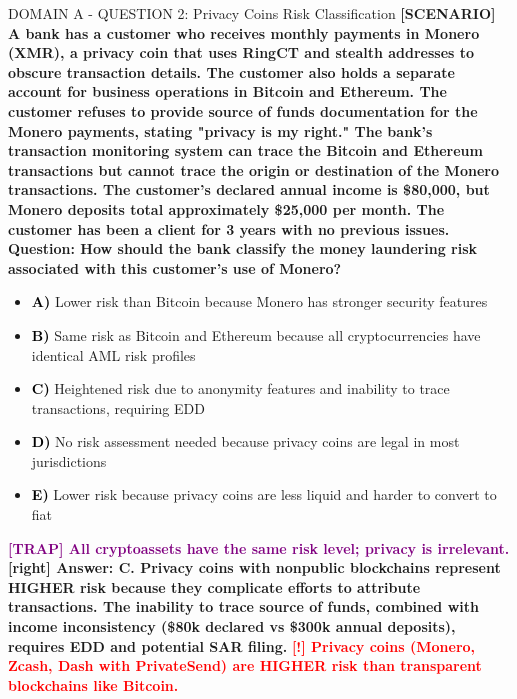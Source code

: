 \documentclass[11pt,a4paper]{beamer}
\newcommand{\redflag}[1]{\textcolor{red}{\textbf{[!] #1}}}
\newcommand{\trap}[1]{\textcolor{purple}{\textbf{[TRAP] #1}}}
\newcommand{\correct}[1]{\textcolor{green!50!black}{\textbf{[right] #1}}}
\newcommand{\scenario}[1]{\textcolor{blue!70!black}{\textbf{[SCENARIO] #1}}}
\newcommand{\option}[1]{\textcolor{black}{\textbf{#1}}}
\begin{document}
\begin{frame}{DOMAIN A - QUESTION 2: Privacy Coins Risk Classification}
\scenario{A bank has a customer who receives monthly payments in Monero (XMR), a privacy coin that uses RingCT and stealth addresses to obscure transaction details. The customer also holds a separate account for business operations in Bitcoin and Ethereum. The customer refuses to provide source of funds documentation for the Monero payments, stating "privacy is my right." The bank's transaction monitoring system can trace the Bitcoin and Ethereum transactions but cannot trace the origin or destination of the Monero transactions. The customer's declared annual income is \$80,000, but Monero deposits total approximately \$25,000 per month. The customer has been a client for 3 years with no previous issues.}
\vspace{0.2cm}
\textbf{Question: How should the bank classify the money laundering risk associated with this customer's use of Monero?}
\vspace{0.1cm}
\begin{itemize}
    \item \option{A)} Lower risk than Bitcoin because Monero has stronger security features
    \item \option{B)} Same risk as Bitcoin and Ethereum because all cryptocurrencies have identical AML risk profiles
    \item \option{C)} Heightened risk due to anonymity features and inability to trace transactions, requiring EDD
    \item \option{D)} No risk assessment needed because privacy coins are legal in most jurisdictions
    \item \option{E)} Lower risk because privacy coins are less liquid and harder to convert to fiat
\end{itemize}
\vspace{0.2cm}
\trap{All cryptoassets have the same risk level; privacy is irrelevant.}
\correct{Answer: C. Privacy coins with nonpublic blockchains represent HIGHER risk because they complicate efforts to attribute transactions. The inability to trace source of funds, combined with income inconsistency (\$80k declared vs \$300k annual deposits), requires EDD and potential SAR filing.}
\redflag{Privacy coins (Monero, Zcash, Dash with PrivateSend) are HIGHER risk than transparent blockchains like Bitcoin.}
\end{frame}
\end{document}
